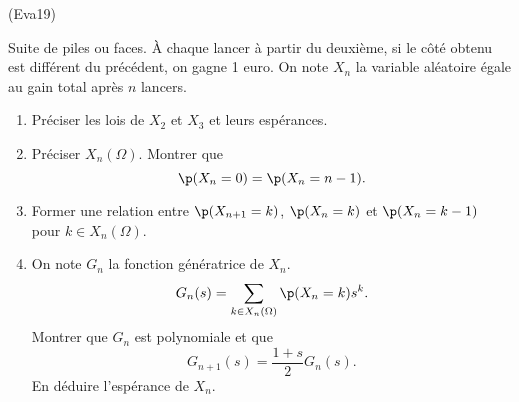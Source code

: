 \begin{tiny}(Eva19)\end{tiny} Suite de piles ou faces.\newline
\`A chaque lancer à partir du deuxième, si le côté obtenu est différent du précédent, on gagne 1 euro. On note $X_n$ la variable aléatoire égale au gain total après $n$ lancers.
\begin{enumerate}
  \item Préciser les lois de $X_2$ et $X_3$ et leurs espérances.
  \item Préciser $X_n(\Omega)$. Montrer que 
\begin{displaymath}
\p(X_n=0) = \p(X_n=n-1).  
\end{displaymath}
  \item Former une relation entre $\p(X_{n+1}=k)$, $\p(X_n =k)$ et $\p(X_n=k-1)$ pour $k\in X_n(\Omega)$.
  \item On note $G_n$ la fonction génératrice de $X_n$.
\begin{displaymath}
  G_n(s) = \sum_{k \in X_n(\Omega)} \p(X_n = k)s^k.
\end{displaymath}
Montrer que $G_n$ est polynomiale et que 
\begin{displaymath}
  G_{n+1}(s) = \frac{1+s}{2}G_n(s).
\end{displaymath}
En déduire l'espérance de $X_n$.
\end{enumerate}
